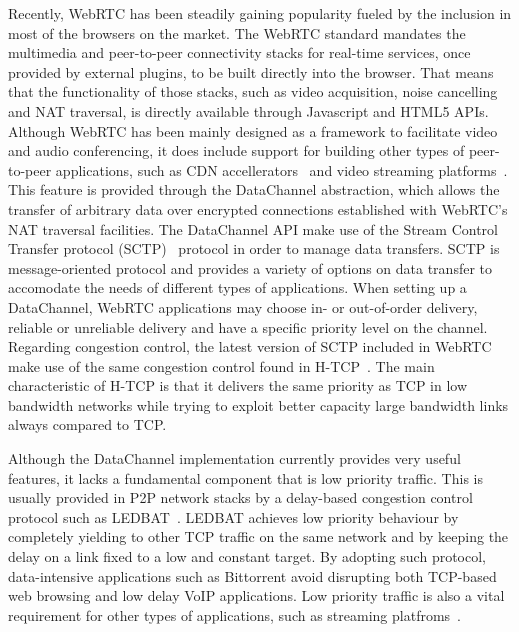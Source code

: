 \documentclass{sig-alternate}
\begin{document}

Recently, WebRTC has been steadily gaining popularity fueled by the inclusion in most of
the browsers on the market. The WebRTC standard mandates the multimedia and peer-to-peer
connectivity stacks for real-time services, once provided by external plugins, to be built
directly into the browser. That means that the functionality of those stacks, such as
video acquisition, noise cancelling and NAT traversal, is directly available through
Javascript and HTML5 APIs. Although WebRTC has been mainly designed as a framework to
facilitate video and audio conferencing, it does include support for building other types
of peer-to-peer applications, such as CDN accellerators~\cite{peerCDN} and video streaming
platforms~\cite{nurminen2013p2p}. This feature is provided through the DataChannel
abstraction, which allows the transfer of arbitrary data over encrypted connections
established with WebRTC's NAT traversal facilities. The DataChannel API make use of the
Stream Control Transfer protocol (SCTP)~\cite{sctp} protocol in order to manage data
transfers. SCTP is message-oriented protocol and provides a variety of options on data
transfer to accomodate the needs of different types of applications. When setting up a
DataChannel, WebRTC applications may choose in- or out-of-order delivery, reliable or
unreliable delivery and have a specific priority level on the channel. Regarding
congestion control, the latest version of SCTP included in WebRTC make use of the same
congestion control found in H-TCP~\cite{htcp}. The main characteristic of H-TCP is that it
delivers the same priority as TCP in low bandwidth networks while trying to exploit better
capacity large bandwidth links always compared to TCP.

Although the DataChannel implementation currently provides very useful features, it lacks
a fundamental component that is low priority traffic. This is usually provided in P2P
network stacks by a delay-based congestion control protocol such as LEDBAT~\cite{ledbat}. LEDBAT
achieves low priority behaviour by completely yielding to other TCP traffic on the same
network and by keeping the delay on a link fixed to a low and constant target. By adopting
such protocol, data-intensive applications such as Bittorrent avoid disrupting both
TCP-based web browsing and low delay VoIP applications. Low priority traffic is also a
vital requirement for other types of applications, such as streaming
platfroms~\cite{smoothcache}\cite{roberto-thesis}.
\end{document}
